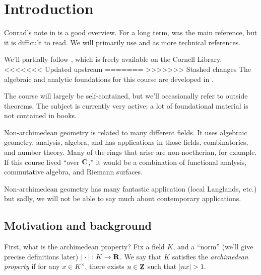 




\chapter{Introduction}

Conrad's note in \cite{aws-2008} is a good overview. For a long term, 
\cite{bgr-1984} was the main reference, but it is difficult to read. We will 
primarily use \cite{berkovich-1990} and \cite{bosch-2014} as more technical 
references. 

We'll partially follow \cite{berkovich-1990}, which is freely available on 
the Cornell Library. 
<<<<<<< Updated upstream
=======
>>>>>>> Stashed changes
The algebraic and analytic foundations for this course are developed in \cite{bgr-1984}. 

The course will largely be self-contained, but we'll occasionally refer to 
outside theorems. The subject is currently very active; a lot of foundational 
material is not contained in books. 

Non-archimedean geometry is related to many different fields. It uses 
algebraic geometry, analysis, algebra, and has applications in those fields, 
combinatorics, and number theory. Many of the rings that arise are 
non-noetherian, for example. If this course lived ``over $\mathbf{C}$,'' it would 
be a combination of functional analysis, commutative algebra, and Riemann 
surfaces. 

Non-archimedean geometry has many fantastic application (local Langlands, etc.) 
but sadly, we will not be able to say much about contemporary applications. 





\section{Motivation and background}

First, what is the archimedean property? Fix a field $K$, and a ``norm'' 
(we'll give precise definitions later) $|\cdot|:K\to \mathbf{R}$. We say that $K$ 
satisfies the \emph{archimedean property} if for any $x\in K^\times$, there 
exists $n\in \mathbf{Z}$ such that $|n x|>1$. 

